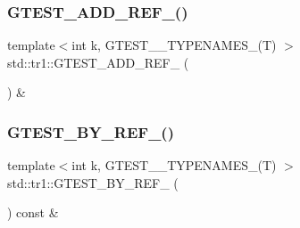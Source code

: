 \mbox{\label{namespacestd_1_1tr1_a495d7fb7a131317a9ba985598d3c1504}} 
\subsubsection{\texorpdfstring{GTEST\_ADD\_REF\_()}{GTEST\_ADD\_REF\_()}}
{\footnotesize\ttfamily template$<$int k, G\+T\+E\+S\+T\+\_\+\_\+\+T\+Y\+P\+E\+N\+A\+M\+E\+S\+\_\+(\+T) $>$ \\
std\+::tr1\+::\+G\+T\+E\+S\+T\+\_\+\+A\+D\+D\+\_\+\+R\+E\+F\+\_\+ (\begin{DoxyParamCaption}\item[{\mbox{\hyperlink{gtest-tuple_8h_a1b7f133d8aa02e0b7afed7b66781eeb7}{G\+T\+E\+S\+T\+\_\+\+T\+U\+P\+L\+E\+\_\+\+E\+L\+E\+M\+E\+N\+T\+\_\+}}(k, \mbox{\hyperlink{namespacestd_1_1tr1_aa636d3269bf1f368a7bc09ff158bc482}{G\+T\+E\+S\+T\+\_\+10\+\_\+\+T\+U\+P\+L\+E\+\_\+}}(T))}]{ }\end{DoxyParamCaption}) \&}

\mbox{\label{namespacestd_1_1tr1_ae7b5ea477ac34a3eef5c4c15c42b76ed}} 
\subsubsection{\texorpdfstring{GTEST\_BY\_REF\_()}{GTEST\_BY\_REF\_()}}
{\footnotesize\ttfamily template$<$int k, G\+T\+E\+S\+T\+\_\+\_\+\+T\+Y\+P\+E\+N\+A\+M\+E\+S\+\_\+(\+T) $>$ \\
std\+::tr1\+::\+G\+T\+E\+S\+T\+\_\+\+B\+Y\+\_\+\+R\+E\+F\+\_\+ (\begin{DoxyParamCaption}\item[{\mbox{\hyperlink{gtest-tuple_8h_a1b7f133d8aa02e0b7afed7b66781eeb7}{G\+T\+E\+S\+T\+\_\+\+T\+U\+P\+L\+E\+\_\+\+E\+L\+E\+M\+E\+N\+T\+\_\+}}(k, \mbox{\hyperlink{namespacestd_1_1tr1_aa636d3269bf1f368a7bc09ff158bc482}{G\+T\+E\+S\+T\+\_\+10\+\_\+\+T\+U\+P\+L\+E\+\_\+}}(T))}]{ }\end{DoxyParamCaption}) const \&}

\mbox{\label{namespacestd_1_1tr1_af7e12a0f5b5791b5b7c49a5a17b85359}} 
